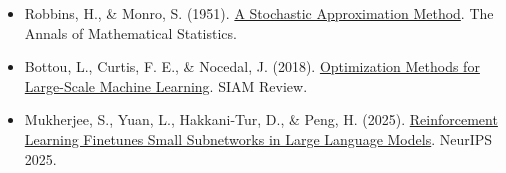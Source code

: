 \vspace{0.25em}
\begin{itemize}
\tightlist
\item
  Robbins, H., \& Monro, S. (1951). \href{https://doi.org/10.1214/aoms/1177729586}{A Stochastic Approximation Method}. The Annals of Mathematical Statistics.
\item
  Bottou, L., Curtis, F. E., \& Nocedal, J. (2018). \href{https://epubs.siam.org/doi/10.1137/16M1080173}{Optimization Methods for Large-Scale Machine Learning}. SIAM Review.
\item
  Mukherjee, S., Yuan, L., Hakkani-Tur, D., \& Peng, H. (2025). \href{https://arxiv.org/abs/2505.11711}{Reinforcement Learning Finetunes Small Subnetworks in Large Language Models}. NeurIPS 2025.
\end{itemize}

\clearpage
